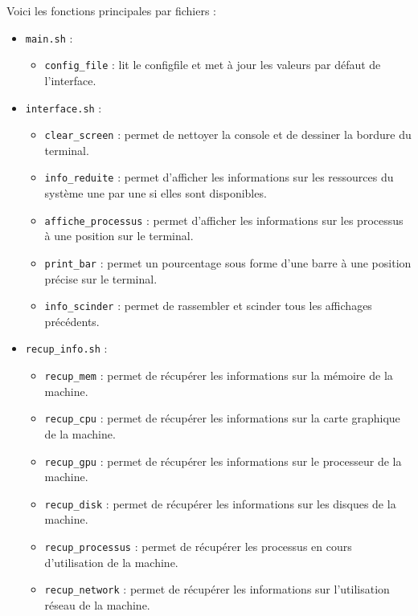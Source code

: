\documentclass{article}
\begin{document}
\newpage
Voici les fonctions principales par fichiers :
\begin{itemize}
    \item \texttt{main.sh} :
        \begin{itemize}[label=\textbullet]
            \item \texttt{config\_file} : lit le configfile et met à jour les valeurs par défaut de l'interface.
        \end{itemize}
    \vspace{0.3em}
    \item \texttt{interface.sh} :
        \begin{itemize}[label=\textbullet]
            \item {\texttt{clear\_screen}} : permet de nettoyer la console et de dessiner la bordure du terminal.
            \item \texttt{info\_reduite} : permet d'afficher les informations sur les ressources du système une par une si elles sont disponibles.
            \item \texttt{affiche\_processus} : permet d'afficher les informations sur les processus à une position sur le terminal.
            \item \texttt{print\_bar} : permet un pourcentage sous forme d'une barre à une position précise sur le terminal.
            \item \texttt{info\_scinder} : permet de rassembler et scinder tous les affichages précédents.
        \end{itemize}
        \vspace{0.3em}
    \item \texttt{recup\_info.sh} :
        \begin{itemize}[label=\textbullet]
            \item \texttt{recup\_mem} : permet de récupérer les informations sur la mémoire de la machine.
            \item \texttt{recup\_cpu} : permet de récupérer les informations sur la carte graphique de la machine.
            \item \texttt{recup\_gpu} : permet de récupérer les informations sur le processeur de la machine.
            \item \texttt{recup\_disk} : permet de récupérer les informations sur les disques de la machine.
            \item \texttt{recup\_processus} : permet de récupérer les processus en cours d'utilisation de la machine.
            \item \texttt{recup\_network} : permet de récupérer les informations sur l'utilisation réseau de la machine.

\end{itemize}
\end{itemize}
\end{document}

